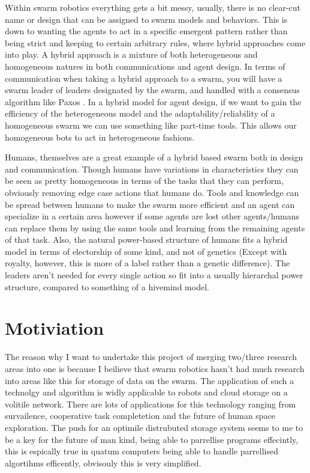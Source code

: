 \documentclass{UoYCSproject}
\begin{document}
Within swarm robotics everything gets a bit messy, usually, there is no clear-cut name or design that can be assigned to swarm models and behaviors. This is down to wanting the agents to act in a specific emergent pattern rather than being strict and keeping to certain arbitrary rules, where hybrid approaches come into play.
A hybrid approach is a mixture of both heterogeneous and homogeneous natures in both communications and agent design.
In terms of communication when taking a hybrid approach to a swarm, you will have a swarm leader of leaders designated by the swarm,
and handled with a consensus algorithm like Paxos \cite{paxos}.
In a hybrid model for agent design, if we want to gain the efficiency of the heterogeneous model and the adaptability/reliability of a homogeneous swarm we can use something like part-time tools. This allows our homogeneous bots to act in heterogeneous fashions.

Humans, themselves are a great example of a hybrid based swarm both in design and communication.
Though humans have variations in characteristics they can be seen as pretty homogeneous in terms of the tasks that they can perform, obviously removing edge case actions that humans do.
Tools and knowledge can be spread between humans to make the swarm more efficient and an agent can specialize in a certain area however if some agents are lost other agents/humans can replace them by using the same tools and learning from the remaining agents of that task.
Also, the natural power-based structure of humans fits a hybrid model in terms of electorship of some kind, and not of genetics (Except with royalty, however, this is more of a label rather than a genetic difference). The leaders aren't needed for every single action so fit into a usually hierarchal power structure, compared to something of a hivemind model.


\chapter{Motiviation}
\label{cha:Motivation}

The reason why I want to undertake this project of merging two/three research areas into one is because I beilieve that swarm robotics hasn't had much research into areas like this for storage of data on the swarm.
The application of such a technolgy and algorithm is widly applicable to robots and cloud storage on a volitile network.
There are lots of applications for this technology ranging from survailence, cooperative task completetion and the future of human space exploration.
The push for an optimile distrubuted storage system seems to me to be a key for the future of man kind, being able to parrellise programs effecintly, this is espically true in quatum computers being able to handle parrellised algortihms efficently, obvisouly this is very simplified.
\end{document}
